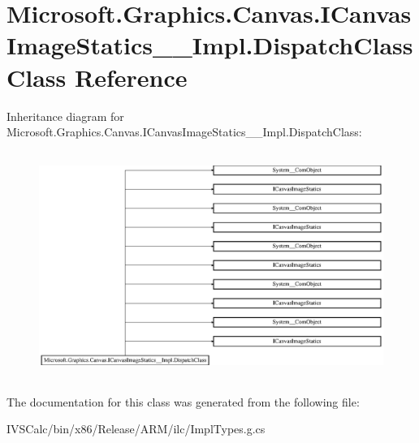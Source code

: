 \hypertarget{class_microsoft_1_1_graphics_1_1_canvas_1_1_i_canvas_image_statics_____impl_1_1_dispatch_class}{}\section{Microsoft.\+Graphics.\+Canvas.\+I\+Canvas\+Image\+Statics\+\_\+\+\_\+\+Impl.\+Dispatch\+Class Class Reference}
\label{class_microsoft_1_1_graphics_1_1_canvas_1_1_i_canvas_image_statics_____impl_1_1_dispatch_class}
Inheritance diagram for Microsoft.\+Graphics.\+Canvas.\+I\+Canvas\+Image\+Statics\+\_\+\+\_\+\+Impl.\+Dispatch\+Class\+:\begin{figure}[H]
\begin{center}
\leavevmode
\includegraphics[height=7.421687cm]{class_microsoft_1_1_graphics_1_1_canvas_1_1_i_canvas_image_statics_____impl_1_1_dispatch_class}
\end{center}
\end{figure}


The documentation for this class was generated from the following file\+:\begin{DoxyCompactItemize}
\item 
I\+V\+S\+Calc/bin/x86/\+Release/\+A\+R\+M/ilc/Impl\+Types.\+g.\+cs\end{DoxyCompactItemize}
